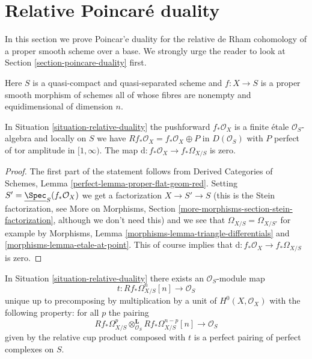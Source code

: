 \section{Relative Poincar\'e duality}
\label{section-relative-poincare-duality}

\noindent
In this section we prove Poincar'e duality for the relative de Rham cohomology
of a proper smooth scheme over a base. We strongly urge the reader to
look at Section \ref{section-poincare-duality} first.

\begin{situation}
\label{situation-relative-duality}
Here $S$ is a quasi-compact and quasi-separated scheme and
$f : X \to S$ is a proper smooth morphism of schemes all of whose
fibres are nonempty and equidimensional of dimension $n$.
\end{situation}

\begin{lemma}
\label{lemma-relative-bottom-part-degenerates}
In Situation \ref{situation-relative-duality} the pushforward
$f_*\mathcal{O}_X$ is a finite \'etale $\mathcal{O}_S$-algebra
and locally on $S$ we have $Rf_*\mathcal{O}_X = f_*\mathcal{O}_X \oplus P$
in $D(\mathcal{O}_S)$ with $P$ perfect of tor amplitude in $[1, \infty)$.
The map $\text{d} : f_*\mathcal{O}_X \to f_*\Omega_{X/S}$ is zero.
\end{lemma}

\begin{proof}
The first part of the statement follows from
Derived Categories of Schemes, Lemma \ref{perfect-lemma-proper-flat-geom-red}.
Setting $S' = \underline{\Spec}_S(f_*\mathcal{O}_X)$ we get a factorization
$X \to S' \to S$ (this is the Stein factorization, see
More on Morphisms, Section \ref{more-morphisms-section-stein-factorization},
although we don't need this)
and we see that $\Omega_{X/S} = \Omega_{X/S'}$ for example by
Morphisms, Lemma \ref{morphisms-lemma-triangle-differentials} and
\ref{morphisms-lemma-etale-at-point}. This of course implies that
$\text{d} : f_*\mathcal{O}_X \to f_*\Omega_{X/S}$ is zero.
\end{proof}

\begin{lemma}
\label{lemma-relative-duality-hodge}
In Situation \ref{situation-relative-duality} there exists an
$\mathcal{O}_S$-module map
$$
t : Rf_*\Omega^n_{X/S}[n] \longrightarrow \mathcal{O}_S
$$
unique up to precomposing by multiplication by a unit of
$H^0(X, \mathcal{O}_X)$ with the following property: for all $p$ the pairing
$$
Rf_*\Omega^p_{X/S}
\otimes_{\mathcal{O}_S}^\mathbf{L}
Rf_*\Omega^{n - p}_{X/S}[n]
\longrightarrow
\mathcal{O}_S
$$
given by the relative cup product composed with $t$
is a perfect pairing of perfect complexes on $S$.
\end{lemma}

